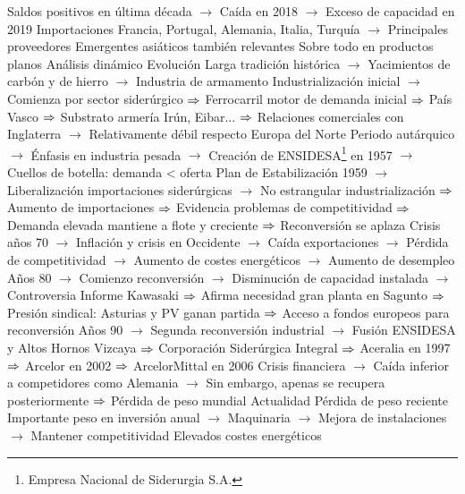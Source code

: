 \documentclass{nuevotema}
\begin{document}
\begin{esquemal}
				\4[] Saldos positivos en última década
				\4[] $\to$ Caída en 2018
				\4[] $\to$ Exceso de capacidad en 2019
				\4 Importaciones
				\4[] Francia, Portugal, Alemania, Italia, Turquía
				\4[] $\to$ Principales proveedores
				\4[] Emergentes asiáticos también relevantes
				\4[] Sobre todo en productos planos
			\3 Análisis dinámico
				\4 Evolución
				\4[] Larga tradición histórica
				\4[] $\to$ Yacimientos de carbón y de hierro
				\4[] $\to$ Industria de armamento
				\4[] Industrialización inicial
				\4[] $\to$ Comienza por sector siderúrgico
				\4[] $\Rightarrow$ Ferrocarril motor de demanda inicial
				\4[] $\Rightarrow$ País Vasco
				\4[] $\Rightarrow$ Substrato armería Irún, Eibar...
				\4[] $\Rightarrow$ Relaciones comerciales con Inglaterra
				\4[] $\to$ Relativamente débil respecto Europa del Norte
				\4[] Periodo autárquico
				\4[] $\to$ Énfasis en industria pesada
				\4[] $\to$ Creación de ENSIDESA\footnote{Empresa Nacional de Siderurgia S.A.} en 1957
				\4[] $\to$ Cuellos de botella: demanda < oferta
				\4[] Plan de Estabilización 1959
				\4[] $\to$ Liberalización importaciones siderúrgicas
				\4[] $\to$ No estrangular industrialización
				\4[] $\Rightarrow$ Aumento de importaciones
				\4[] $\Rightarrow$ Evidencia problemas de competitividad
				\4[] $\Rightarrow$ Demanda elevada mantiene a flote y creciente
				\4[] $\Rightarrow$ Reconversión se aplaza
				\4[] Crisis años 70
				\4[] $\to$ Inflación y crisis en Occidente
				\4[] $\to$ Caída exportaciones
				\4[] $\to$ Pérdida de competitividad
				\4[] $\to$ Aumento de costes energéticos
				\4[] $\to$ Aumento de desempleo
				\4[] Años 80
				\4[] $\to$ Comienzo reconversión
				\4[] $\to$ Disminución de capacidad instalada
				\4[] $\to$ Controversia Informe Kawasaki
				\4[] $\Rightarrow$ Afirma necesidad gran planta en Sagunto
				\4[] $\Rightarrow$ Presión sindical: Asturias y PV ganan partida
				\4[] $\Rightarrow$ Acceso a fondos europeos para reconversión
				\4[] Años 90
				\4[] $\to$ Segunda reconversión industrial
				\4[] $\to$ Fusión ENSIDESA y Altos Hornos Vizcaya
				\4[] $\Rightarrow$ Corporación Siderúrgica Integral
				\4[] $\Rightarrow$ Aceralia en 1997
				\4[] $\Rightarrow$ Arcelor en 2002
				\4[] $\Rightarrow$ ArcelorMittal en 2006
				\4[] Crisis financiera
				\4[] $\to$ Caída inferior a competidores como Alemania
				\4[] $\to$ Sin embargo, apenas se recupera posteriormente
				\4[] $\Rightarrow$ Pérdida de peso mundial
				\4 Actualidad
				\4[] Pérdida de peso reciente
				\4[] Importante peso en inversión anual
				\4[] $\to$ Maquinaria
				\4[] $\to$ Mejora de instalaciones
				\4[] $\to$ Mantener competitividad
				\4[] Elevados costes energéticos

\end{esquemal}
\end{document}
